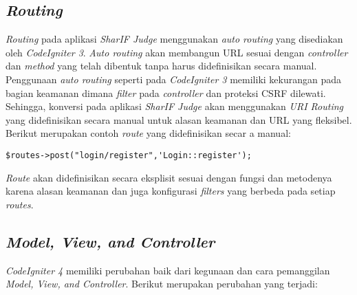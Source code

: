 \subsection{\textit{Routing}}
\textit{Routing} pada aplikasi \textit{SharIF Judge} menggunakan \textit{auto routing} yang disediakan oleh \textit{CodeIgniter 3}. \textit{Auto routing} akan membangun URL sesuai dengan \textit{controller} dan \textit{method} yang telah dibentuk tanpa harus didefinisikan secara manual. Penggunaan \textit{auto routing} seperti pada \textit{CodeIgniter 3} memiliki kekurangan pada bagian keamanan dimana \textit{filter} pada \textit{controller} dan proteksi CSRF dilewati. Sehingga, konversi pada aplikasi \textit{SharIF Judge} akan menggunakan \textit{URI Routing} yang didefinisikan secara manual untuk alasan keamanan dan URL yang fleksibel. Berikut merupakan contoh \textit{route} yang didefinisikan secar a manual:
\begin{center}
\verb|$routes->post("login/register",'Login::register');|
\end{center}
\textit{Route} akan didefinisikan secara eksplisit sesuai dengan fungsi dan metodenya karena alasan keamanan dan juga konfigurasi \textit{filters} yang berbeda pada setiap \textit{routes}.

\subsection{\textit{Model, View, and Controller}}
\textit{CodeIgniter 4} memiliki perubahan baik dari kegunaan dan cara pemanggilan \textit{Model, View, and Controller}. Berikut merupakan perubahan yang terjadi:
